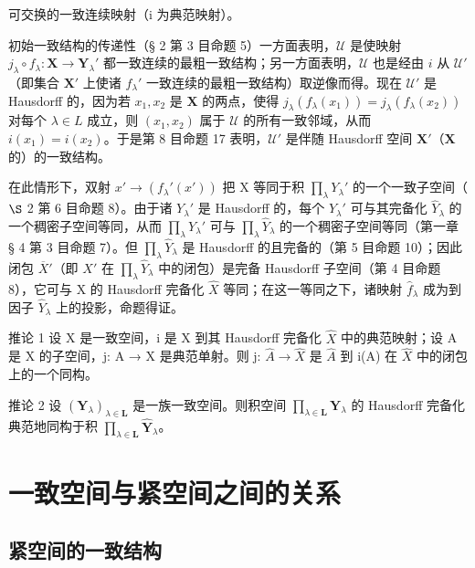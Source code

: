 可交换的一致连续映射（i 为典范映射）。

初始一致结构的传递性（§ 2 第 3 目命题 5）一方面表明，\(\mathcal{U}\) 是使映射 \(j_{\lambda} \circ f_{\lambda}: \mathbf{X} \to \mathbf{Y}_{\lambda}'\) 都一致连续的最粗一致结构；另一方面表明，\(\mathcal{U}\) 也是经由 \(i\) 从 \(\mathcal{U}'\)（即集合 \(\mathbf{X}'\) 上使诸 \(f_{\lambda}'\) 一致连续的最粗一致结构）取逆像而得。现在 \(\mathcal{U}'\) 是 Hausdorff 的，因为若 \(x_{1}, x_{2}\) 是 \(\mathbf{X}\) 的两点，使得 \(j_{\lambda}(f_{\lambda}(x_{1})) = j_{\lambda}(f_{\lambda}(x_{2}))\) 对每个 \(\lambda \in L\) 成立，则 \((x_{1}, x_{2})\) 属于 \(\mathcal{U}\) 的所有一致邻域，从而 \(i(x_{1}) = i(x_{2})\)。于是第 8 目命题 17 表明，\(\mathcal{U}'\) 是伴随 Hausdorff 空间 \(\mathbf{X}'\)（\(\mathbf{X}\) 的）的一致结构。

在此情形下，双射 \(x' \to (f_{\lambda}'(x'))\) 把 X 等同于积 \(\prod_{\lambda} Y_{\lambda}'\) 的一个一致子空间（ \(\S\) 2 第 6 目命题 8）。由于诸 \(Y_{\lambda}'\) 是 Hausdorff 的，每个 \(Y_{\lambda}'\) 可与其完备化 \(\hat{Y}_{\lambda}\) 的一个稠密子空间等同，从而 \(\prod_{\lambda} Y_{\lambda}'\) 可与 \(\prod_{\lambda} \hat{Y}_{\lambda}\) 的一个稠密子空间等同（第一章 § 4 第 3 目命题 7）。但 \(\prod_{\lambda} \hat{Y}_{\lambda}\) 是 Hausdorff 的且完备的（第 5 目命题 10）；因此闭包 \(\overline{X}'\)（即 \(X'\) 在 \(\prod_{\lambda} \hat{Y}_{\lambda}\) 中的闭包）是完备 Hausdorff 子空间（第 4 目命题 8），它可与 X 的 Hausdorff 完备化 \(\hat{X}\) 等同；在这一等同之下，诸映射 \(\hat{f}_{\lambda}\) 成为到因子 \(\hat{Y}_{\lambda}\) 上的投影，命题得证。

推论 1 设 X 是一致空间，i 是 X 到其 Hausdorff 完备化 \(\hat{X}\) 中的典范映射；设 A 是 X 的子空间，j: A → X 是典范单射。则 j: \(\hat{A} \rightarrow \hat{X}\) 是 \(\hat{A}\) 到 i(A) 在 \(\hat{X}\) 中的闭包上的一个同构。

推论 2 设 \((\mathbf{Y}_{\lambda})_{\lambda \in \mathbf{L}}\) 是一族一致空间。则积空间 \(\prod_{\lambda \in \mathbf{L}}\mathbf{Y}_{\lambda}\) 的 Hausdorff 完备化典范地同构于积 \(\prod_{\lambda \in \mathbf{L}}\hat{\mathbf{Y}}_{\lambda}\)。

\section{一致空间与紧空间之间的关系}

\subsection{紧空间的一致结构}

